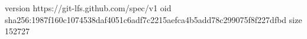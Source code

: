 version https://git-lfs.github.com/spec/v1
oid sha256:1987f160c1074538daf4051c6adf7c2215aefca4b5add78c299075f8f227dfbd
size 152727
